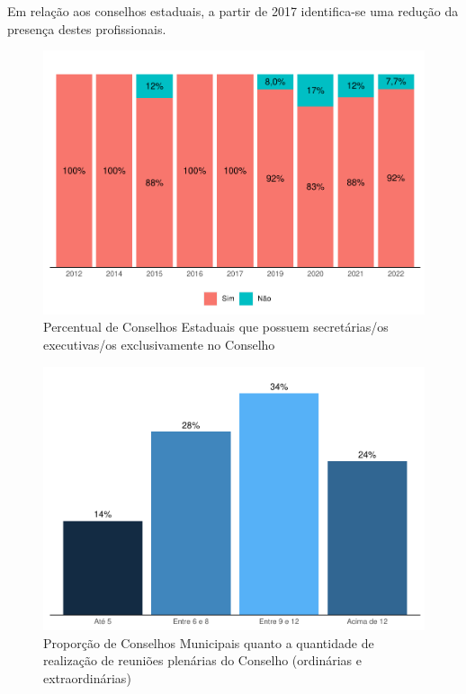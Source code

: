 \documentclass[
  brazilian]{report}
\begin{document}
Em relação aos conselhos estaduais, a partir de 2017 identifica-se uma
redução da presença destes profissionais.

\begin{figure}
\includegraphics{Censo-SUAS-2022_files/figure-latex/ceas_se-1} \caption[Percentual de Conselhos Estaduais que possuem secretárias/os executivas/os exclusivamente no Conselho]{Percentual de Conselhos Estaduais que possuem secretárias/os executivas/os exclusivamente no Conselho}\label{fig:ceas_se}
\end{figure}

\begin{figure}
\includegraphics{Censo-SUAS-2022_files/figure-latex/qtdcmas_reuniao-1} \caption[Proporção de Conselhos Municipais quanto a quantidade de realização de reuniões plenárias do Conselho (ordinárias e extraordinárias)]{Proporção de Conselhos Municipais quanto a quantidade de realização de reuniões plenárias do Conselho (ordinárias e extraordinárias)}\label{fig:qtdcmas_reuniao}
\end{figure}
\end{document}
